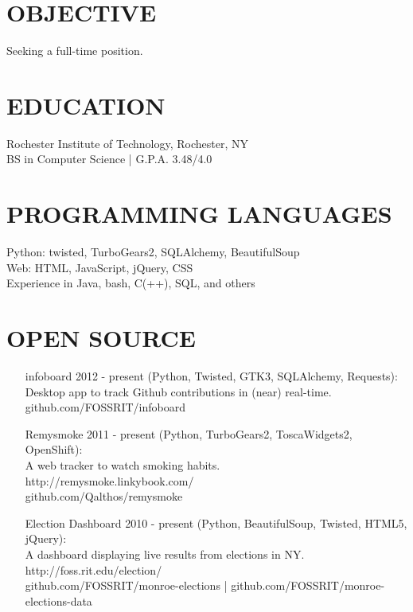 \documentclass[line]{res}
\begin{document}

\begin{resume}

\section{OBJECTIVE}
    Seeking a full-time position.

\section{EDUCATION}
    Rochester Institute of Technology, Rochester, NY \\
    BS in Computer Science | G.P.A. 3.48/4.0

\section{PROGRAMMING LANGUAGES}
    Python: twisted, TurboGears2, SQLAlchemy, BeautifulSoup\\
    Web: HTML, JavaScript, jQuery, CSS\\
    Experience in Java, bash, C(++), SQL, and others

\section{OPEN SOURCE}
    \begin{itemize}
        \item[infoboard]
            2012 - present (Python, Twisted, GTK3, SQLAlchemy, Requests):\\
            Desktop app to track Github contributions in (near) real-time.\\
            github.com/FOSSRIT/infoboard

        \item[Remysmoke]
            2011 - present (Python, TurboGears2, ToscaWidgets2, OpenShift):\\
            A web tracker to watch smoking habits.\\
            http://remysmoke.linkybook.com/\\
            github.com/Qalthos/remysmoke

        \item[Election Dashboard]
            2010 - present (Python, BeautifulSoup, Twisted, HTML5, jQuery):\\
            A dashboard displaying live results from elections in NY.\\
            http://foss.rit.edu/election/\\
            github.com/FOSSRIT/monroe-elections | github.com/FOSSRIT/monroe-elections-data


\end{itemize}
\end{resume}
\end{document}
